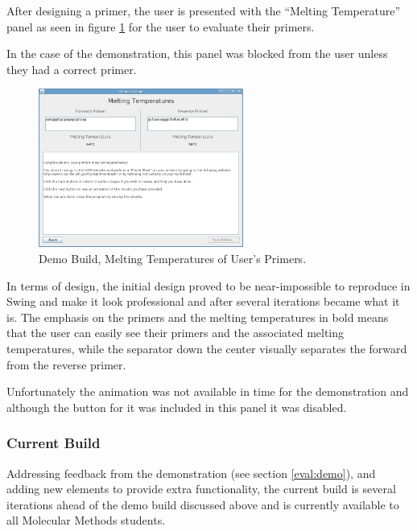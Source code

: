 After designing a primer, the user is presented with the ``Melting
Temperature'' panel as seen in figure \ref{fig:demoBuild:meltingTemp}
for the user to evaluate their primers.

In the case of the demonstration, this panel was blocked from the user
unless they had a correct primer.

\begin{figure}[h]
  \begin{center}
    \includegraphics[width=0.6\textwidth]{./images/demoBuild/meltingTemp.png}
    \caption{
      \label{fig:demoBuild:meltingTemp}
      Demo Build, Melting Temperatures of User's Primers.
    }
  \end{center}
\end{figure}

In terms of design, the initial design proved to be near-impossible to
reproduce in Swing and make it look professional and after several
iterations became what it is.
The emphasis on the primers and the melting temperatures in bold means
that the user can easily see their primers and the associated melting
temperatures, while the separator down the center visually separates
the forward from the reverse primer.

Unfortunately the animation was not available in time for the
demonstration and although the button for it was included in this
panel it was disabled.


\subsubsection{Current Build}

Addressing feedback from the demonstration (see section \ref{eval:demo}),
and adding new elements to provide extra functionality, the current
build is several iterations ahead of the demo build discussed above
and is currently available to all Molecular Methods students.

